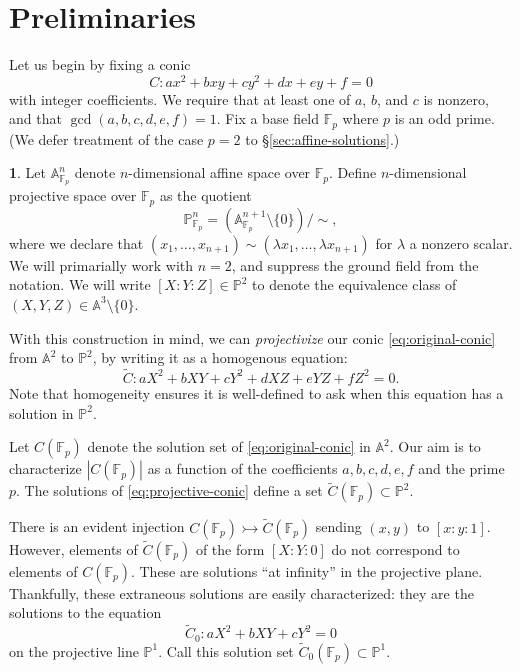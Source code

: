 \documentclass[10pt,a4paper]{amsart}
\numberwithin{equation}{section}
\numberwithin{figure}{section}
\theoremstyle{definition}
\theoremstyle{plain}
\theoremstyle{remark}
\theoremstyle{plain}
\theoremstyle{definition}
\newtheorem{defn}[thm]{\protect\definitionname}
\theoremstyle{plain}
\theoremstyle{plain}
\providecommand{\definitionname}{Definition}
\newcommand{\A}{\mathbb{A}}
\renewcommand{\P}{\mathbb{P}}
\newcommand{\F}{\mathbb{F}}
\begin{document}
    \section{Preliminaries}\label{sec:projectivization-of-the-problem}

    Let us begin by fixing a conic
    \begin{equation}\label{eq:original-conic} 
        C \colon ax^2 + bxy + cy^2 + dx + ey + f = 0 
    \end{equation} 
    with integer coefficients. We require that at least one of 
    $a$, $b$, and $c$ is nonzero, and that $\gcd(a,b,c,d,e,f)=1$.
    Fix a base field $\F_p$ where $p$ is an odd prime. (We defer treatment of the case $p = 2$ to \S\ref{sec:affine-solutions}.)
    \begin{defn}
        Let $\A^n_{\F_p}$ denote $n$-dimensional affine space over $\F_p$. Define 
        $n$-dimensional projective space over $\F_p$ as the quotient
        \[ \P^n_{\F_p} = (\A^{n+1}_{\F_p}\setminus \{0\})/{\sim}, \]
        where we declare that $(x_1,\ldots,x_{n+1}) \sim 
        (\lambda x_1,\ldots,\lambda x_{n+1})$ for $\lambda$ a nonzero scalar. We
        will primarially work with $n = 2$, and suppress the ground field from the 
        notation. We will write $[X:Y:Z]\in \P^2$ to denote the equivalence 
        class of $(X,Y,Z)\in \A^3 \setminus \{0\}$.
    \end{defn}

    With this construction in mind, we can \emph{projectivize} our conic
    \eqref{eq:original-conic} from $\A^2$ to $\P^2$, by writing it as a 
    homogenous equation: 
    \begin{equation}\label{eq:projective-conic} 
        \widetilde{C} \colon aX^2 + bXY + cY^2 + dXZ + eYZ + fZ^2 = 0. 
    \end{equation}
    Note that homogeneity ensures it is well-defined to ask when this
    equation has a solution in $\P^2$.

    Let $C(\F_p)$ denote the solution set of \eqref{eq:original-conic} in $\A^2$. Our aim
    is to characterize $|C(\F_p)|$ as a function of the coefficients $a,b,c,d,e,f$ and 
    the prime $p$. The solutions of \eqref{eq:projective-conic} define a set
    $\widetilde{C}(\F_p) \subset \P^2$.

    There is an evident injection $C(\F_p) \rightarrowtail \widetilde{C}(\F_p)$ sending $(x,y)$ to
    $[x:y:1]$. However, elements of $\widetilde{C}(\F_p)$ of the form $[X:Y:0]$ do not 
    correspond to elements of $C(\F_p)$. 
    These are solutions ``at infinity'' in the projective plane.
    Thankfully, these extraneous solutions are easily characterized: they are the
    solutions to the equation
    \begin{equation}\label{eq:projective-conic-at-infinity} 
        \widetilde{C}_0 \colon aX^2 + bXY + cY^2 = 0
    \end{equation} 
    on the projective line $\P^1$. Call this solution set $\widetilde{C}_0(\F_p)\subset \P^1$.  
\end{document}
